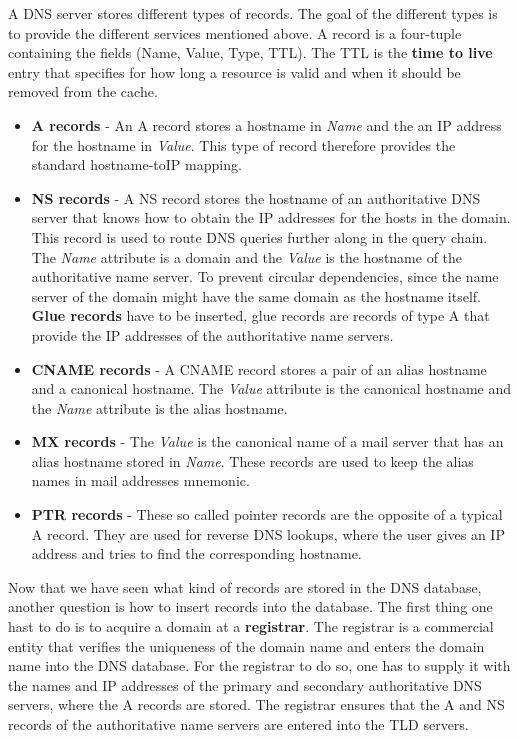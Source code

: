 A DNS server stores different types of records. The goal of the different types is to provide the different services mentioned above. A record is a four-tuple containing the fields (Name, Value, Type, TTL). The TTL is the \textbf{time to live} entry that specifies for how long a resource is valid and when it should be removed from the cache.
\begin{itemize}
\item \textbf{A records} - An A record stores a hostname in \textit{Name} and the an IP address for the hostname in \textit{Value}. This type of record therefore provides the standard hostname-toIP mapping.
\item \textbf{NS records} - A NS record stores the hostname of an authoritative DNS server that knows how to obtain the IP addresses for the hosts in the domain. This record is used to route DNS queries further along in the query chain. The \textit{Name} attribute is a domain and the \textit{Value} is the hostname of the authoritative name server. To prevent circular dependencies, since the name server of the domain might have the same domain as the hostname itself. \textbf{Glue records} have to be inserted, glue records are records of type A that provide the IP addresses of the authoritative name servers.
\item \textbf{CNAME records} - A CNAME record stores a pair of an alias hostname and a canonical hostname. The \textit{Value} attribute is the canonical hostname and the \textit{Name} attribute is the alias hostname.
\item \textbf{MX records} - The \textit{Value} is the canonical name of a mail server that has an alias hostname stored in \textit{Name}. These records are used to keep the alias names in mail addresses mnemonic.
\item \textbf{PTR records} - These so called pointer records are the opposite of a typical A record. They are used for reverse DNS lookups, where the user gives an IP address and tries to find the corresponding hostname. 
\end{itemize}
Now that we have seen what kind of records are stored in the DNS database, another question is how to insert records into the database. The first thing one hast to do is to acquire a domain at a \textbf{registrar}. The registrar is a commercial entity that verifies the uniqueness of the domain name and enters the domain name into the DNS database. For the registrar to do so, one has to supply it with the names and IP addresses of the primary and secondary authoritative DNS servers, where the A records are stored. The registrar ensures that the A and NS records of the authoritative name servers are entered into the TLD servers.\vspace{.3cm}\\

